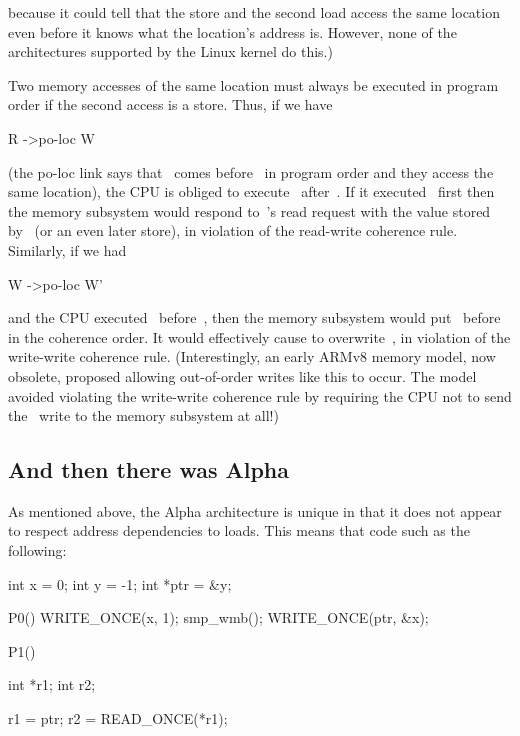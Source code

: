 \noindent%
because it could tell that the store and the second load access the
same location even before it knows what the location's address is.
However, none of the architectures supported by the Linux kernel do
this.)

Two memory accesses of the same location must always be executed in
program order if the second access is a store.
Thus, if we have

\begin{VerbatimU}
	R ->po-loc W
\end{VerbatimU}

\noindent%
(the po-loc link says that ~comes before~ in program order and they
access the same location), the CPU is obliged to execute~ after~.
If it executed~ first then the memory subsystem would respond to~'s
read request with the value stored by~ (or an even later store), in
violation of the read-write coherence rule.
Similarly, if we had

\begin{VerbatimU}
	W ->po-loc W'
\end{VerbatimU}

\noindent%
and the CPU executed~ before~, then the memory subsystem would
put~ before~ in the coherence order.
It would effectively cause  to overwrite~, in violation of
the write-write coherence rule.
(Interestingly, an early ARMv8 memory model, now obsolete, proposed
allowing out-of-order writes like this to occur.
The model avoided violating the write-write coherence rule by
requiring the CPU not to send the ~write to the memory subsystem at all!)


\subsection{And then there was Alpha}
\label{sec:docs:explanation:And Then There Was Alpha}

As mentioned above, the Alpha architecture is unique in that it does
not appear to respect address dependencies to loads.
This means that code such as the following:

\begin{VerbatimU}
	int x = 0;
	int y = -1;
	int *ptr = &y;

	P0()
	{
		WRITE_ONCE(x, 1);
		smp_wmb();
		WRITE_ONCE(ptr, &x);
	}

	P1()
	{
		int *r1;
		int r2;

		r1 = ptr;
		r2 = READ_ONCE(*r1);
	}
\end{VerbatimU}


